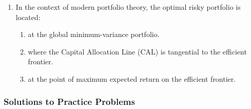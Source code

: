 \begin{enumerate}
	\item In the context of modern portfolio theory, the optimal risky portfolio is located:
	      \begin{enumerate}[label=\Alph*.]
		      \item at the global minimum-variance portfolio.
		      \item where the Capital Allocation Line (CAL) is tangential to the efficient frontier.
		      \item at the point of maximum expected return on the efficient frontier.
	      \end{enumerate}
\end{enumerate}

\subsubsection{Solutions to Practice Problems}
\label{subsec:app_Solutions_M8}

